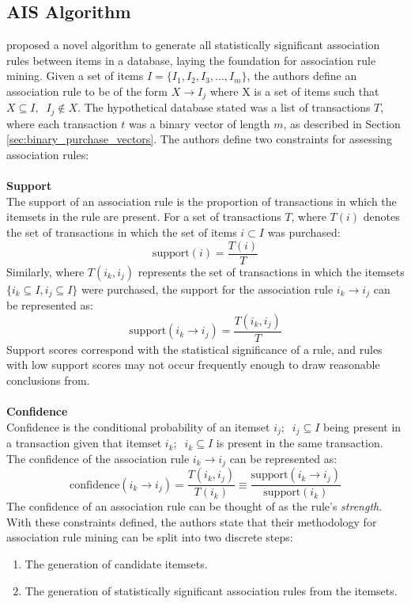 \subsection{AIS Algorithm}
\label{sec:ais}
 proposed a novel algorithm to generate all statistically significant association rules between items in a database, laying the foundation for association rule mining. Given a set of items $I = \{I_1, I_2, I_3,\dots,I_m\}$, the authors define an association rule to be of the form $X \rightarrow I_j$ where X is a set of items such that $X \subseteq I,\;\; I_j \notin X$.  The hypothetical database stated was a list of transactions $T$, where each transaction $t$ was a binary vector of length $m$, as described in Section \ref{sec:binary_purchase_vectors}. The authors define two constraints for assessing association rules:
\\\\\textbf{Support}\\
The support of an association rule is the proportion of transactions in which the itemsets in the rule are present. For a set of transactions $T$, where $T(i)$ denotes the set of transactions in which the set of items $i \subset I$ was purchased:
\[
\text{support}(i) = \frac{T(i)}{T} 
\]
Similarly, where $T{(i_k, i_j)}$ represents the set of transactions in which the itemsets $\{i_k \subseteq I, i_j\subseteq I\}$ were purchased, the support for the association rule $i_k \rightarrow i_j$ can be represented as:
\[
\text{support}(i_k \rightarrow i_j) = \frac{T(i_k, i_j)}{T} 
\]
Support scores correspond with the statistical significance of a rule, and rules with low support scores may not occur frequently enough to draw reasonable conclusions from.
\\\\\textbf{Confidence}\\
Confidence is the conditional probability of an itemset $i_j;\;\;i_j \subseteq I$ being present in a transaction given that itemset $i_k;\;\;i_k \subseteq I$ is present in the same transaction. The confidence of the association rule $i_k \rightarrow i_j$ can be represented as:
\[
\text{confidence}(i_k \rightarrow i_j) = \frac{T(i_k, i_j)}{T(i_k)} \equiv \frac{\text{support}(i_k \rightarrow i_j)}{\text{support}(i_k)}
\]
The confidence of an association rule can be thought of as the rule's \textit{strength}.
\\With these constraints defined, the authors state that their methodology for association rule mining can be split into two discrete steps:
\begin{enumerate}
\item The generation of candidate itemsets.
\item The generation of statistically significant association rules from the itemsets.
\end{enumerate}
